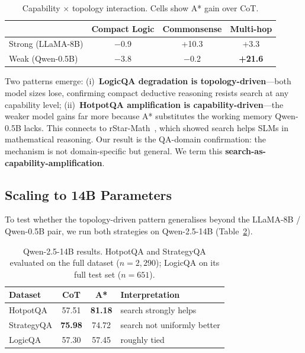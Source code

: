 \documentclass{article}
\begin{document}
\begin{table}[t]
\centering
\caption{Capability $\times$ topology interaction.  Cells show A* gain over
CoT.}
\label{tab:interaction}
\small
\begin{tabular}{@{}lccc@{}}
\toprule
& \textbf{Compact Logic} & \textbf{Commonsense} & \textbf{Multi-hop} \\
\midrule
Strong (LLaMA-8B) & $-$0.9 & +10.3 & +3.3 \\
Weak (Qwen-0.5B)  & $-$3.8 & $-$0.2 & \textbf{+21.6} \\
\bottomrule
\end{tabular}
\end{table}

Two patterns emerge: (i)~\textbf{LogicQA degradation is topology-driven}---both
model sizes lose, confirming compact deductive reasoning resists search at any
capability level; (ii)~\textbf{HotpotQA amplification is capability-driven}---the
weaker model gains far more because A* substitutes the working memory
Qwen-0.5B lacks.  This connects to rStar-Math~\citep{guan2025rstar}, which
showed search helps SLMs in mathematical reasoning.  Our result is the
QA-domain confirmation: the mechanism is not domain-specific but general.  We
term this \textbf{search-as-capability-amplification}.

\subsection{Scaling to 14B Parameters}
\label{sec:scaling}

To test whether the topology-driven pattern generalises beyond the LLaMA-8B /
Qwen-0.5B pair, we run both strategies on Qwen-2.5-14B
(Table~\ref{tab:14b}).

\begin{table}[t]
\centering
\caption{Qwen-2.5-14B results.  HotpotQA and StrategyQA evaluated on the full
dataset ($n{=}2{,}290$); LogicQA on its full test set ($n{=}651$).}
\label{tab:14b}
\small
\begin{tabular}{@{}lccl@{}}
\toprule
\textbf{Dataset} & \textbf{CoT} & \textbf{A*} & \textbf{Interpretation} \\
\midrule
HotpotQA    & 57.51 & \textbf{81.18} & search strongly helps \\
StrategyQA  & \textbf{75.98} & 74.72 & search not uniformly better \\
LogicQA     & 57.30 & 57.45 & roughly tied \\
\bottomrule
\end{tabular}
\end{table}
\end{document}
